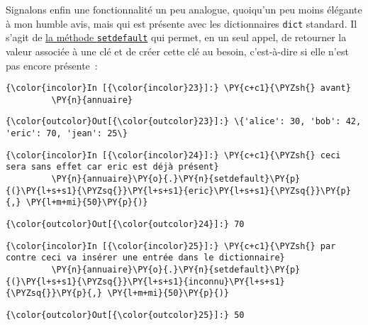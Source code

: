     Signalons enfin une fonctionnalité un peu analogue, quoiqu'un peu moins
élégante à mon humble avis, mais qui est présente avec les dictionnaires
\texttt{dict} standard. Il s'agit de
\href{https://docs.python.org/3/library/stdtypes.html\#dict.setdefault}{la
méthode \texttt{setdefault}} qui permet, en un seul appel, de retourner
la valeur associée à une clé et de créer cette clé au besoin,
c'est-à-dire si elle n'est pas encore présente~:

    \begin{Verbatim}[commandchars=\\\{\}]
{\color{incolor}In [{\color{incolor}23}]:} \PY{c+c1}{\PYZsh{} avant}
         \PY{n}{annuaire}
\end{Verbatim}


\begin{Verbatim}[commandchars=\\\{\}]
{\color{outcolor}Out[{\color{outcolor}23}]:} \{'alice': 30, 'bob': 42, 'eric': 70, 'jean': 25\}
\end{Verbatim}
            
    \begin{Verbatim}[commandchars=\\\{\}]
{\color{incolor}In [{\color{incolor}24}]:} \PY{c+c1}{\PYZsh{} ceci sera sans effet car eric est déjà présent}
         \PY{n}{annuaire}\PY{o}{.}\PY{n}{setdefault}\PY{p}{(}\PY{l+s+s1}{\PYZsq{}}\PY{l+s+s1}{eric}\PY{l+s+s1}{\PYZsq{}}\PY{p}{,} \PY{l+m+mi}{50}\PY{p}{)}
\end{Verbatim}


\begin{Verbatim}[commandchars=\\\{\}]
{\color{outcolor}Out[{\color{outcolor}24}]:} 70
\end{Verbatim}
            
    \begin{Verbatim}[commandchars=\\\{\}]
{\color{incolor}In [{\color{incolor}25}]:} \PY{c+c1}{\PYZsh{} par contre ceci va insérer une entrée dans le dictionnaire}
         \PY{n}{annuaire}\PY{o}{.}\PY{n}{setdefault}\PY{p}{(}\PY{l+s+s1}{\PYZsq{}}\PY{l+s+s1}{inconnu}\PY{l+s+s1}{\PYZsq{}}\PY{p}{,} \PY{l+m+mi}{50}\PY{p}{)}
\end{Verbatim}


\begin{Verbatim}[commandchars=\\\{\}]
{\color{outcolor}Out[{\color{outcolor}25}]:} 50
\end{Verbatim}
            
